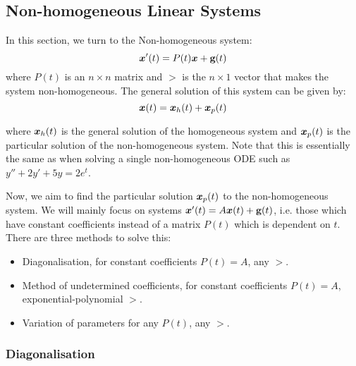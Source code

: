 \subsection{Non-homogeneous Linear Systems}

In this section, we turn to the Non-homogeneous system:
\[
\bm{x}'(t) = P(t) \bm{x} + \textbf{g}(t)
\]
where $P(t)$ is an $n \times n$ matrix and $\gt$ is the $n \times 1$ vector that makes the system non-homogeneous. The general solution of this system can be given by:
\begin{equation}
	\bm{x}(t) = \bm{x}_h(t) + \bm{x}_p(t)
\end{equation}

where $\bm{x}_h(t)$ is the general solution of the homogeneous system and $\bm{x}_p(t)$ is the particular solution of the non-homogeneous system. Note that this is essentially the same as when solving a single non-homogeneous ODE such as $y'' + 2y' + 5y = 2 e^t$.

Now, we aim to find the particular solution $\bm{x}_p(t)$ to the non-homogeneous system. We will mainly focus on systems $\bm{x}'(t) = A\bm{x}(t) + \textbf{g}(t)$, i.e. those which have constant coefficients instead of a matrix $P(t)$ which is dependent on $t$. There are three methods to solve this:
\begin{itemize}
	\item Diagonalisation, for constant coefficients $P(t) = A$, any $\gt$.
	\item Method of undetermined coefficients, for constant coefficients $P(t) = A$, exponential-polynomial $\gt$.
	\item Variation of parameters for any $P(t)$, any $\gt$.
\end{itemize}


\subsubsection{Diagonalisation}

